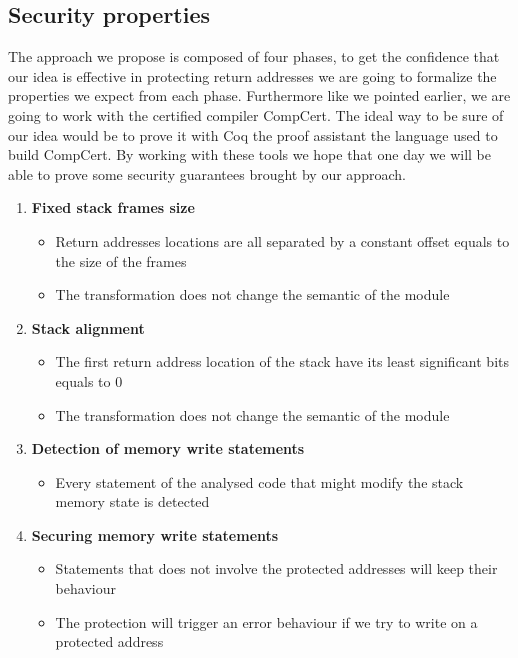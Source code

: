 \documentclass[11pt]{sdm}
\begin{document}
\subsection{Security properties}
\label{sub:Security properties}
	The approach we propose is composed of four phases, to get the confidence that our idea is effective in protecting return addresses we are going to formalize the properties we expect from each phase. 
Furthermore like we pointed earlier, we are going to work with the certified compiler CompCert.
The ideal way to be sure of our idea would be to prove it with Coq the proof assistant the language used to build CompCert.
By working with these tools we hope that one day we will be able to prove some security guarantees brought by our approach.

\begin{enumerate}
	\item \textbf{Fixed stack frames size}
		\begin{itemize}
			\item Return addresses locations are all separated by a constant offset equals to the size of the frames
			\item The transformation does not change the semantic of the module 
		\end{itemize}
	\item \textbf{Stack alignment}
		\begin{itemize}
			\item The first return address location of the stack have its least significant bits equals to 0
			\item The transformation does not change the semantic of the module 
		\end{itemize}
	\item \textbf{Detection of memory write statements}
		\begin{itemize}
			\item Every statement of the analysed code that might modify the stack memory state is detected
		\end{itemize}
	\item \textbf{Securing memory write statements}
		\begin{itemize}
			\item Statements that does not involve the protected addresses will keep their behaviour
			\item The protection will trigger an error behaviour if we try to write on a protected address
		\end{itemize}
\end{enumerate}
\end{document}
